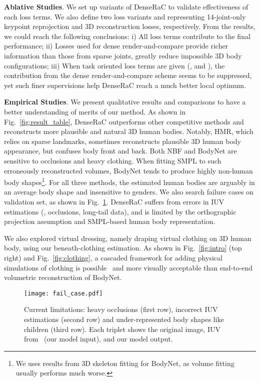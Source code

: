 \documentclass[10pt,twocolumn,letterpaper]{article}
\newcommand{\beforefigcaption}{\vspace{0mm}}
\newcommand{\afterfigcaption}{\vspace{0mm}}
\begin{document}
\textbf{Ablative Studies}. We set up variants of DenseRaC to validate effectiveness of each loss terms. We also define two loss variants  and  representing 14-joint-only keypoint reprojection and 3D reconstruction losses, respectively. From the results, we could reach the following conclusions: i) All loss terms contribute to the final performance; ii) Losses used for dense render-and-compare provide richer information than those from sparse joints, greatly reduce impossible 3D body configurations; iii) When task oriented loss terms are given (\ie,  and ), the contribution from the dense render-and-compare scheme seems to be suppressed, yet such finer supervisions help DenseRaC reach a much better local optimum. 

\textbf{Empirical Studies}. We present qualitative results and comparisons to have a better understanding of merits of our method.
As shown in Fig.~\ref{fig:result_table}, DenseRaC outperforms other competitive methods and reconstructs more plausible and natural 3D human bodies. Notably,
HMR, which relies on sparse landmarks, sometimes reconstructs plausible 3D human body appearance, but confuses body front and back.
Both NBF and BodyNet are sensitive to occlusions and heavy clothing. When fitting SMPL to such erroneously reconstructed volumes, BodyNet tends to produce highly non-human body shapes\footnote{We uses results from 3D skeleton fitting for BodyNet, as volume fitting usually performs much worse.}. For all three methods, the estimated human bodies are arguably in an average body shape and insensitive to genders. 
We also search failure cases on validation set, as shown in Fig.~\ref{fig:failcase}. DenseRaC suffers from errors in IUV estimations (\eg, occlusions, long-tail data), and is limited by the orthographic projection assumption and SMPL-based human body representation.

We also explored virtual dressing, namely draping virtual clothing on 3D human body, using our beneath-clothing estimation. As shown in Fig.~\ref{fig:intro} (top right) and Fig.~\ref{fig:clothing}, a cascaded framework for adding physical simulations of clothing is possible~\cite{guan2012drape,deepwrinkles18} and more visually acceptable than end-to-end volumetric reconstruction of BodyNet.

\begin{figure}[ptb]
\centering
\texttt{[image: fail\_case.pdf]}
\beforefigcaption
\caption{Current limitations: heavy occlusions (first row), incorrect IUV estimations (second row) and under-represented body shapes like children (third row). Each triplet shows the original image, IUV from~\cite{DensePose2018} (our model input), and our model output.}
\afterfigcaption
\label{fig:failcase}
\end{figure}
\end{document}

